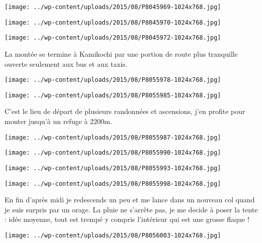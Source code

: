 \centerline{\texttt{[image: ../wp-content/uploads/2015/08/P8045969-1024x768.jpg]} } 
 \newline
 \newline
\centerline{\texttt{[image: ../wp-content/uploads/2015/08/P8045970-1024x768.jpg]} } 
 \newline
 \newline
\centerline{\texttt{[image: ../wp-content/uploads/2015/08/P8045972-1024x768.jpg]} } 
 \newline
 La montée se termine à Kamikochi par une portion de route plus tranquille ouverte seulement aux bus et aux taxis. \newline
 \newline
\centerline{\texttt{[image: ../wp-content/uploads/2015/08/P8055978-1024x768.jpg]} } 
 \newline
 \newline
\centerline{\texttt{[image: ../wp-content/uploads/2015/08/P8055985-1024x768.jpg]} } 
 \newline
 C'est le lieu de départ de plusieurs randonnées et ascensions, j'en profite pour monter jusqu'à un refuge à 2200m. \newline
 \newline
\centerline{\texttt{[image: ../wp-content/uploads/2015/08/P8055987-1024x768.jpg]} } 
 \newline
 \newline
\centerline{\texttt{[image: ../wp-content/uploads/2015/08/P8055990-1024x768.jpg]} } 
 \newline
 \newline
\centerline{\texttt{[image: ../wp-content/uploads/2015/08/P8055993-1024x768.jpg]} } 
 \newline
 \newline
\centerline{\texttt{[image: ../wp-content/uploads/2015/08/P8055998-1024x768.jpg]} } 
 \newline
 En fin d'après midi je redescends un peu et me lance dans un nouveau col quand je suis surpris par un orage. La pluie ne s'arrête pas, je me decide à poser la tente : idée moyenne, tout est trempé y compris l'intérieur qui est une grosse flaque ! \newline
 \newline
\centerline{\texttt{[image: ../wp-content/uploads/2015/08/P8056003-1024x768.jpg]} } 
 \newline
 \newline

